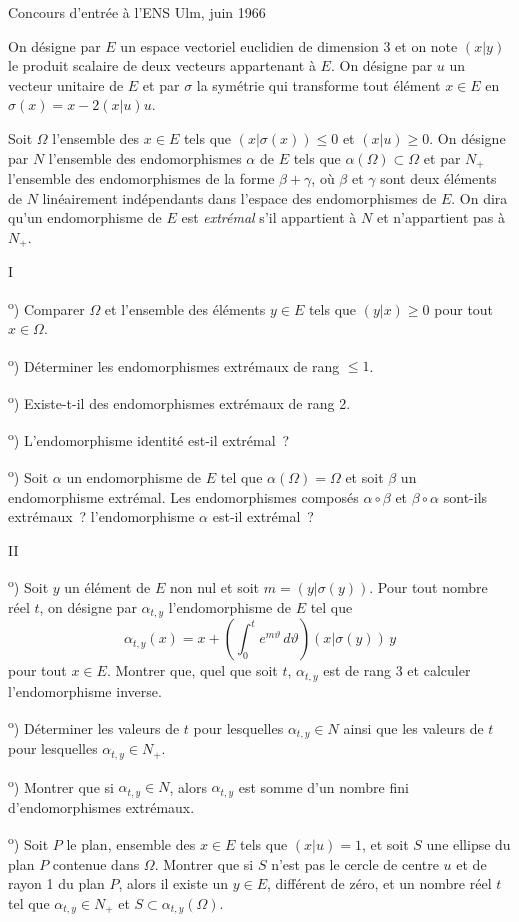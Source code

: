 \documentclass[a4paper,11pt]{article}
\newcommand{\partie}[1]{\par\bigskip\centerline{#1}\medskip}
\newcommand{\q}[1]{\par\smallskip\noindent#1\textsuperscript{o})}
\begin{document}
\centerline{\large Concours d'entrée à l'ENS Ulm, juin 1966}
\bigskip

On désigne par $E$ un espace vectoriel euclidien de dimension 3 et on note $(x|y)$ le produit scalaire de deux vecteurs appartenant à $E$. On désigne par $u$ un vecteur unitaire de $E$ et par $\sigma$ la symétrie qui transforme tout élément $x\in E$ en $\sigma(x)=x-2(x|u)u$.

Soit $\Omega$ l'ensemble des $x\in E$ tels que $(x|\sigma(x))\leq0$ et $(x|u)\geq0$. On désigne par $N$ l'ensemble des endomorphismes $\alpha$ de $E$ tels que $\alpha(\Omega)\subset\Omega$ et par $N_+$ l'ensemble des endomorphismes de la forme $\beta+\gamma$, où $\beta$ et $\gamma$ sont deux éléments de $N$ linéairement indépendants dans l'espace des endomorphismes de $E$. On dira qu'un endomorphisme de $E$ est \emph{extrémal} s'il appartient à $N$ et n'appartient pas à $N_+$.

\partie{I}

\q1 Comparer $\Omega$ et l'ensemble des éléments $y\in E$ tels que $(y|x)\geq0$ pour tout $x\in\Omega$.

\q2 Déterminer les endomorphismes extrémaux de rang $\leq1$.

\q3 Existe-t-il des endomorphismes extrémaux de rang 2.

\q4 L'endomorphisme identité est-il extrémal~?

\q5 Soit $\alpha$ un endomorphisme de $E$ tel que $\alpha(\Omega)=\Omega$ et soit $\beta$ un endomorphisme extrémal. Les endomorphismes composés $\alpha\circ\beta$ et $\beta\circ\alpha$ sont-ils extrémaux~? l'endomorphisme $\alpha$ est-il extrémal~?

\partie{II}

\q1 Soit $y$ un élément de $E$ non nul et soit $m=(y|\sigma(y))$. Pour tout nombre réel $t$, on désigne par $\alpha_{t,y}$ l'endomorphisme de $E$ tel que
\[
  \alpha_{t,y}(x)=x+\left(\int_0^t e^{m\vartheta}\,d\vartheta\right)(x|\sigma(y))\,y
\]
pour tout $x\in E$. Montrer que, quel que soit $t$, $\alpha_{t,y}$ est de rang 3 et calculer l'endomorphisme inverse.

\q2 Déterminer les valeurs de $t$ pour lesquelles $\alpha_{t,y}\in N$ ainsi que les valeurs de $t$ pour lesquelles $\alpha_{t,y}\in N_+$.

\q3 Montrer que si $\alpha_{t,y}\in N$, alors $\alpha_{t,y}$ est somme d'un nombre fini d'endomorphismes extrémaux.

\q4 Soit $P$ le plan, ensemble des $x\in E$ tels que $(x|u)=1$, et soit $S$ une ellipse du plan $P$ contenue dans $\Omega$. Montrer que si $S$ n'est pas le cercle de centre $u$ et de rayon 1 du plan $P$, alors il existe un $y\in E$, différent de zéro, et un nombre réel $t$ tel que $\alpha_{t,y}\in N_+$ et $S\subset\alpha_{t,y}(\Omega)$.
\end{document}
